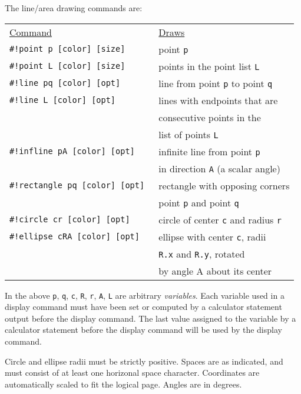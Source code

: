 \documentclass[12pt]{article}
\begin{document}
\begin{minipage}{\textwidth}
The line/area drawing commands are:
\\[1ex]
\begin{tabular}{@{}l@{~~~~~}l@{}}
\underline{Command} & \underline{Draws}
\\[1ex]
\tt \#!point p [color] [size] & point {\tt p} \\
\tt \#!point L [color] [size] & points in the point list {\tt L} \\
\tt \#!line pq [color] [opt] & line from point {\tt p}
                                 to point {\tt q} \\
\tt \#!line L  [color] [opt] & lines with endpoints that are \\
                             & consecutive points in the \\
		             & list of points {\tt L} \\
\tt \#!infline pA [color] [opt] & infinite line from point {\tt p} \\
                                & in direction {\tt A}
				  (a scalar angle) \\
\tt \#!rectangle pq [color] [opt] & rectangle with opposing corners \\
                                  & point {\tt p} and point {\tt q} \\
\tt \#!circle cr [color] [opt] & circle of center {\tt c}
                                   and radius {\tt r} \\
\tt \#!ellipse cRA [color] [opt] & ellipse with center {\tt c}, radii \\
                                   & {\tt R.x} and {\tt R.y}, rotated \\
                                   & by angle A about its center \\
\end{tabular}
\end{minipage}

In the above {\tt p}, {\tt q}, {\tt c}, {\tt R}, {\tt r}, {\tt A}, {\tt L}
are arbitrary {\em variables}.  Each variable used in a display command
must have been set or computed by a calculator statement output before
the display command.  The last value assigned to the variable by a
calculator statement before the display command will be used by the
display command.

Circle and ellipse radii must be strictly positive.
Spaces are as indicated, and must consist
of at least one horizonal space character.
Coordinates are automatically scaled to fit the logical page.  Angles are
in degrees.
\end{document}
